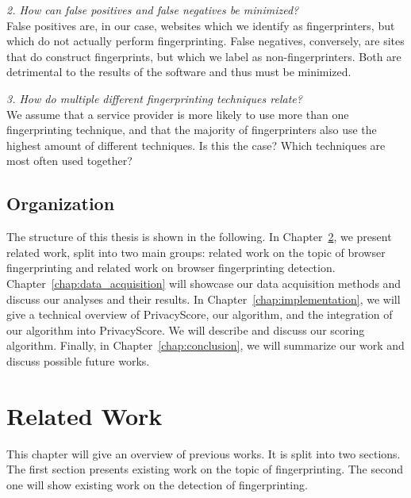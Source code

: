 \documentclass[
    fontsize=12pt,
    headings=small,
    parskip=half,
    bibliography=totoc,
    numbers=noenddot,
    open=any
    ]{scrreprt}
\begin{document}
\textit{2. How can false positives and false negatives be minimized?}\\
False positives are, in our case, websites which we identify as fingerprinters, but which do not actually
perform fingerprinting. False negatives, conversely, are sites that do construct fingerprints, but which we
label as non-fingerprinters.
Both are detrimental to the results of the software and thus must be minimized.

\textit{3. How do multiple different fingerprinting techniques relate?}\\
We assume that a service provider is more likely to use more than one fingerprinting technique,
and that the majority of fingerprinters also use the highest amount of different techniques.
Is this the case? Which techniques are most often used together?


\section{Organization}
The structure of this thesis is shown in the following.
In Chapter~\ref{chap:related_work}, we present related work, split into two main groups:
related work on the topic of browser fingerprinting and related work on
browser fingerprinting detection.
Chapter~\ref{chap:data_acquisition} will showcase our data acquisition
methods and discuss our analyses and their results.
In Chapter~\ref{chap:implementation}, we will give a technical overview of PrivacyScore,
our algorithm, and the integration of our algorithm into PrivacyScore.
We will describe and discuss our scoring algorithm.
Finally, in Chapter~\ref{chap:conclusion}, we will summarize our work and discuss possible future works.




\chapter{Related Work}
\label{chap:related_work}
This chapter will give an overview of previous works. It is split into two sections.
The first section presents existing work on the topic of fingerprinting. The second one will show existing work on
the detection of fingerprinting.
\end{document}
